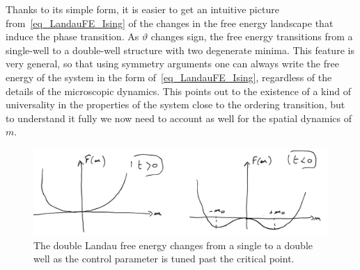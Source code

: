 Thanks to its simple form, it is easier to get an intuitive picture from~\eqref{eq_LandauFE_Ising} of the changes in the free energy landscape that induce the phase transition.
As $\vartheta$ changes sign, the free energy transitions from a single-well to a double-well structure with two degenerate minima.
This feature is very general, so that using symmetry arguments one can always write the free energy of the system in the form of~\eqref{eq_LandauFE_Ising}, regardless of the details of the microscopic dynamics.
This points out to the existence of a kind of universality in the properties of the system close to the ordering transition, but to understand it fully we now need to account as well for the spatial dynamics of $m$.

\begin{figure}[!t]
    \centering
    \includegraphics[width=.8\textwidth]{chapters/Figures/introduction/double_well.png}
    \caption{The double Landau free energy changes from a single to a double well as the control parameter is tuned past the critical point.}
    \label{fig: double well}
\end{figure}

